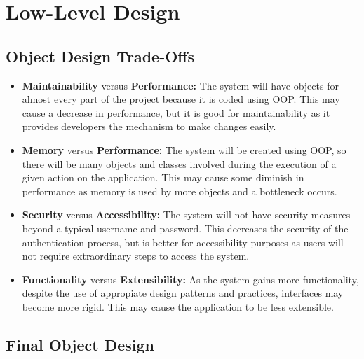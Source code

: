 \documentclass[a4paper, 12pt, titlepage]{article}
\begin{document}
  \pagebreak
  \section{Low-Level Design}

  \subsection{Object Design Trade-Offs}

  \begin{itemize}
    \item \textbf{Maintainability} versus \textbf{Performance:}
      The system will have objects for almost every part of the project because it is coded using OOP.
      This may cause a decrease in performance, but it is good for maintainability
      as it provides developers the mechanism to make changes easily.
    \item \textbf{Memory} versus \textbf{Performance:}
      The system will be created using OOP, so there will be many objects and classes involved
      during the execution of a given action on the application.
      This may cause some diminish in performance as memory is used by more objects and a bottleneck occurs.
    \item \textbf{Security} versus \textbf{Accessibility:}
      The system will not have security measures beyond a typical username and password.
      This decreases the security of the authentication process, but is better for accessibility purposes
      as users will not require extraordinary steps to access the system.
    \item \textbf{Functionality} versus \textbf{Extensibility:}
      As the system gains more functionality, despite the use of appropiate design patterns and practices,
      interfaces may become more rigid. This may cause the application to be less extensible.
  \end{itemize}

  \subsection{Final Object Design}
\end{document}
